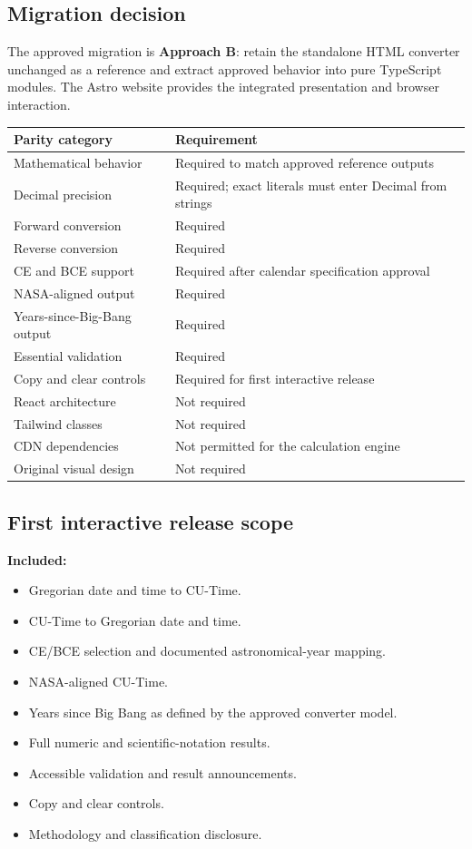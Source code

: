 \documentclass[11pt,letterpaper]{article}
\begin{document}
\subsection{Migration decision}

The approved migration is \textbf{Approach B}: retain the standalone HTML
converter unchanged as a reference and extract approved behavior into pure
TypeScript modules. The Astro website provides the integrated presentation and
browser interaction.

\begin{tabularx}{\textwidth}{L{2.25in}Y}
\toprule
\textbf{Parity category} & \textbf{Requirement} \\
\midrule
Mathematical behavior & Required to match approved reference outputs \\
Decimal precision & Required; exact literals must enter Decimal from strings \\
Forward conversion & Required \\
Reverse conversion & Required \\
CE and BCE support & Required after calendar specification approval \\
NASA-aligned output & Required \\
Years-since-Big-Bang output & Required \\
Essential validation & Required \\
Copy and clear controls & Required for first interactive release \\
React architecture & Not required \\
Tailwind classes & Not required \\
CDN dependencies & Not permitted for the calculation engine \\
Original visual design & Not required \\
\bottomrule
\end{tabularx}

\subsection{First interactive release scope}

\textbf{Included:}

\begin{itemize}
    \item Gregorian date and time to CU-Time.
    \item CU-Time to Gregorian date and time.
    \item CE/BCE selection and documented astronomical-year mapping.
    \item NASA-aligned CU-Time.
    \item Years since Big Bang as defined by the approved converter model.
    \item Full numeric and scientific-notation results.
    \item Accessible validation and result announcements.
    \item Copy and clear controls.
    \item Methodology and classification disclosure.
\end{itemize}
\end{document}
